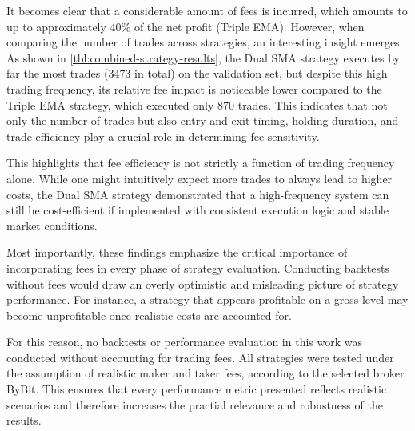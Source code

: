 \noindent
It becomes clear that a considerable amount of fees is incurred, which amounts to up to approximately 40\% of the net profit (Triple EMA).
However, when comparing the number of trades across strategies, an interesting insight emerges.
As shown in \autoref{tbl:combined-strategy-results}, the Dual SMA strategy executes by far the most trades (3473 in total) on the validation set, but despite this high trading frequency, its relative fee impact is noticeable lower compared to the Triple EMA strategy, which executed only 870 trades.
This indicates that not only the number of trades but also entry and exit timing, holding duration, and trade efficiency play a crucial role in determining fee sensitivity.

This highlights that fee efficiency is not strictly a function of trading frequency alone.
While one might intuitively expect more trades to always lead to higher costs, the Dual SMA strategy demonstrated that a high-frequency system can still be cost-efficient if implemented with consistent execution logic and stable market conditions.

Most importantly, these findings emphasize the critical importance of incorporating fees in every phase of strategy evaluation.
Conducting backtests without fees would draw an overly optimistic and misleading picture of strategy performance.
For instance, a strategy that appears profitable on a gross level may become unprofitable once realistic costs are accounted for.

For this reason, no backtests or performance evaluation in this work was conducted without accounting for trading fees.
All strategies were tested under the assumption of realistic maker and taker fees, according to the selected broker ByBit.
This ensures that every performance metric presented reflects realistic scenarios and therefore increases the practial relevance and robustness of the results.

